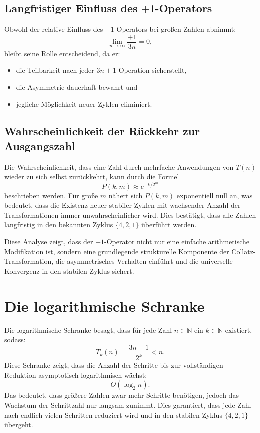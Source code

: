 \documentclass[a4paper,12pt]{article}
\begin{document}
\subsection{Langfristiger Einfluss des \(+1\)-Operators}
Obwohl der relative Einfluss des \(+1\)-Operators bei großen Zahlen abnimmt:
\[
\lim_{n \to \infty} \frac{+1}{3n} = 0,
\]
bleibt seine Rolle entscheidend, da er:

\begin{itemize}
    \item die Teilbarkeit nach jeder \( 3n+1 \)-Operation sicherstellt,
    \item die Asymmetrie dauerhaft bewahrt und
    \item jegliche Möglichkeit neuer Zyklen eliminiert.
\end{itemize}

\subsection{Wahrscheinlichkeit der Rückkehr zur Ausgangszahl}
Die Wahrscheinlichkeit, dass eine Zahl durch mehrfache Anwendungen von \( T(n) \) wieder zu sich selbst zurückkehrt, kann durch die Formel
\[
P(k, m) \approx e^{-k/2^m}
\]
beschrieben werden. Für große \( m \) nähert sich \( P(k, m) \) exponentiell null an, was bedeutet, dass die Existenz neuer stabiler Zyklen mit wachsender Anzahl der Transformationen immer unwahrscheinlicher wird. Dies bestätigt, dass alle Zahlen langfristig in den bekannten Zyklus \( \{4,2,1\} \) überführt werden.

Diese Analyse zeigt, dass der \(+1\)-Operator nicht nur eine einfache arithmetische Modifikation ist, sondern eine grundlegende strukturelle Komponente der Collatz-Transformation, die asymmetrisches Verhalten einführt und die universelle Konvergenz in den stabilen Zyklus sichert.


\section{Die logarithmische Schranke}
Die logarithmische Schranke besagt, dass für jede Zahl \( n \in \mathbb{N} \) ein \( k \in \mathbb{N} \) existiert, sodass:
\[
T_k(n) = \frac{3n + 1}{2^k} < n.
\]
Diese Schranke zeigt, dass die Anzahl der Schritte bis zur vollständigen Reduktion asymptotisch logarithmisch wächst:
\[
O(\log_2 n).
\]
Das bedeutet, dass größere Zahlen zwar mehr Schritte benötigen, jedoch das Wachstum der Schrittzahl nur langsam zunimmt. Dies garantiert, dass jede Zahl nach endlich vielen Schritten reduziert wird und in den stabilen Zyklus \( \{4,2,1\} \) übergeht.
\end{document}
